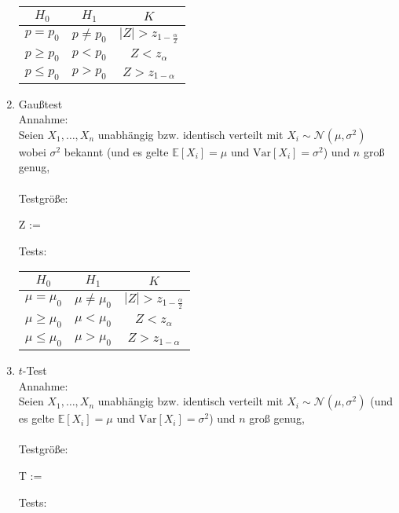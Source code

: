 \documentclass[landscape, 8pt]{extarticle}
\newcommand{\Var}{\mathrm{Var}}
\newcommand{\E}{\mathbb{E}}
\newcommand{\Normal}{\mathcal{N}}
\begin{document}
\begin{multicols*}{3}
\begin{enumerate}
{\begin{center}
\begin{tabular}{|c|c|c|}
    \hline
    $H_0$            & $H_1$         & $K$ \\
    \hline
    $p=p_0$          & $p \neq p_0$  & $|Z| > z_{1-\frac{\alpha}{2}}$ \\
    \hline
    $p\geq p_0$      & $p < p_0$     & $Z < z_\alpha$ \\
    \hline
    $p\leq p_0$      & $p > p_0$     & $Z > z_{1 - \alpha}$ \\
    \hline
\end{tabular}    
\end{center}
}
\item {Gaußtest\\
Annahme: \\
Seien $X_1,\dots,X_n$ unabhängig bzw. identisch verteilt mit $X_i \sim \Normal(\mu, \sigma^2)$ wobei $\sigma^2$ bekannt (und es gelte $\E[X_i] = \mu$ und $\Var[X_i] = \sigma^2$) und $n$ groß genug,\\\\
Testgröße:
\begin{myeq}
Z :=  
\end{myeq}
Tests:
\begin{center}
\begin{tabular}{|c|c|c|}
    \hline
    $H_0$            & $H_1$         & $K$ \\
    \hline
    $\mu=\mu_0$          & $\mu \neq \mu_0$  & $|Z| > z_{1-\frac{\alpha}{2}}$ \\
    \hline
    $\mu\geq \mu_0$      & $\mu < \mu_0$     & $Z < z_\alpha$ \\
    \hline
    $\mu\leq \mu_0$      & $\mu > \mu_0$     & $Z > z_{1 - \alpha}$ \\
    \hline
\end{tabular}    
\end{center}
}
\item {$t$-Test\\
Annahme: \\
Seien $X_1,\dots,X_n$ unabhängig bzw. identisch verteilt mit $X_i \sim \Normal(\mu, \sigma^2)$ (und es gelte $\E[X_i] = \mu$ und $\Var[X_i] = \sigma^2$) und $n$ groß genug,\\\\
Testgröße:
\begin{myeq}
T :=  
\end{myeq}
Tests:
\begin{center}
\begin{tabular}{|c|c|c|}

\end{tabular}
\end{center}}
\end{enumerate}
\end{multicols*}
\end{document}
